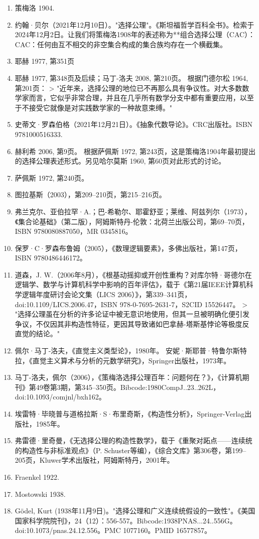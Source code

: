 \begin{enumerate}
\item 策梅洛 1904.  
\item 约翰·贝尔（2021年12月10日）。"选择公理"。《斯坦福哲学百科全书》。检索于2024年12月2日。让我们将策梅洛1908年的表述称为**组合选择公理（CAC）：  
CAC：任何由互不相交的非空集合构成的集合族均存在一个横截集。  
\item 耶赫 1977, 第351页  
\item 耶赫 1977, 第348页及后续；马丁-洛夫 2008, 第210页。  
根据门德尔松 1964, 第201页：  
> "近年来，选择公理的地位已不再那么具有争议性。对大多数数学家而言，它似乎非常合理，并且在几乎所有数学分支中都有重要应用，以至于不接受它就像是对实践数学家的一种故意束缚。"  
\item 史蒂文·罗森伯格（2021年12月21日）。《抽象代数导论》。CRC出版社。ISBN 9781000516333.  
\item 赫利希 2006, 第9页。  
根据萨佩斯 1972, 第243页，这是策梅洛1904年最初提出的选择公理表述形式。另见哈尔莫斯 1960, 第60页对此形式的讨论。  
\item 萨佩斯 1972, 第240页。  
\item 图拉基斯（2003），第209–210页，第215–216页。  
\item 弗兰克尔、亚伯拉罕·A.；巴-希勒尔、耶霍舒亚；莱维、阿兹列尔（1973），《集合论基础》（第二版），阿姆斯特丹-伦敦：北荷兰出版公司，第69–70页，ISBN 9780080887050，MR 0345816。  
\item 保罗·C·罗森布鲁姆（2005），《数理逻辑要素》，多佛出版社，第147页，ISBN 9780486446172。 
\item 道森，J. W.（2006年8月），《根基动摇抑或开创性重构？对库尔特·哥德尔在逻辑学、数学与计算机科学中影响的百年评估》，载于《第21届IEEE计算机科学逻辑年度研讨会论文集（LICS 2006）》，第339–341页，doi:10.1109/LICS.2006.47，ISBN 978-0-7695-2631-7，S2CID 15526447。  
> "选择公理虽在分析的许多论证中被无意识地使用，但其一旦被明确化便引发争议，不仅因其非构造性特征，更因其导致诸如巴拿赫-塔斯基悖论等极度反直觉的结论。"  
\item 佩尔·马丁-洛夫，《直觉主义类型论》，1980年。  
安妮·斯耶普·特鲁尔斯特拉，《直觉主义算术与分析的元数学研究》，Springer出版社，1973年。  
\item 马丁-洛夫，佩尔（2006），《策梅洛选择公理百年：问题何在？》，《计算机期刊》第49卷第3期，第345–350页。Bibcode:1980CompJ..23..262L，doi:10.1093/comjnl/bxh162。  
\item 埃雷特·毕晓普与道格拉斯·S·布里奇斯，《构造性分析》，Springer-Verlag出版社，1985年。  
\item 弗雷德·里奇曼，《无选择公理的构造性数学》，载于《重聚对跖点——连续统的构造性与非标准观点》（P. Schuster等编），《综合文库》第306卷，第199–205页，Kluwer学术出版社，阿姆斯特丹，2001年。  
\item Fraenkel 1922.  
\item Mostowski 1938.  
\item Gödel, Kurt (1938年11月9日)。"选择公理和广义连续统假设的一致性"。《美国国家科学院院刊》，24（12）：556-557。Bibcode:1938PNAS...24..556G。doi:10.1073/pnas.24.12.556。PMC 1077160。PMID 16577857。


\end{enumerate}
